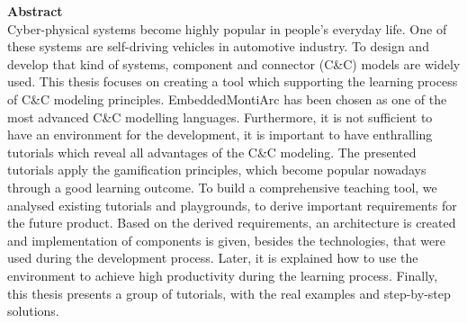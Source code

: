 \vspace*{2cm}

\vspace{10ex}
{\bf\Large Abstract} \\ [1em]
Cyber-physical systems become highly popular in people's everyday life. One of these systems are self-driving vehicles in automotive industry. To design and develop that kind of systems, component and connector (C\&C) models are widely used. This thesis focuses on creating a tool which supporting the learning process of C\&C modeling principles. EmbeddedMontiArc has been chosen as one of the most advanced C\&C modelling languages. Furthermore, it is not sufficient to have an environment for the development, it is important to have enthralling tutorials which reveal all advantages of the C\&C modeling. The presented tutorials apply the gamification principles, which become popular nowadays through a good learning outcome. To build a comprehensive teaching tool, we analysed existing tutorials and playgrounds, to derive important requirements for the future product. Based on the derived requirements, an architecture is created and implementation of components is given, besides the technologies, that were used during the development process. Later, it is explained how to use the environment to achieve high productivity during the learning process. Finally, this thesis presents a group of tutorials, with the real examples and step-by-step solutions.
\cleardoublepage
